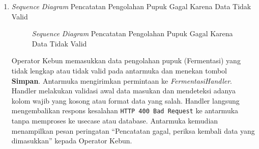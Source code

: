 \documentclass[a4paper,11pt]{article}
\begin{document}
\begin{enumerate}
    \textbf{Penjelasan Alur:}
    \begin{itemize}
        \item \textbf{Aksi Awal:} Operator Kebun membuka menu cek fermentasi pada batch yang terindikasi gagal.
        \item \textbf{Alur Backend:} Operator mengisi kondisi fisik, memilih status ``Gagal'', dan menekan \textbf{Simpan}. Antarmuka mengirim request status update dengan param \texttt{status=Gagal}.
        \item \textbf{Akses Data:} Usecase memanggil repositori fermentasi untuk mengubah status batch fermentasi terkait menjadi ``Gagal'' di database.
        \item \textbf{Output:} Data batch berhasil diperbarui di database dan antarmuka menampilkan notifikasi status gagal.
    \end{itemize}

    \item \textit{Sequence Diagram} Pencatatan Pengolahan Pupuk Gagal Karena Data Tidak Valid
    \begin{figure}[H]
        \centering
        \caption{\textit{Sequence Diagram} Pencatatan Pengolahan Pupuk Gagal Karena Data Tidak Valid}
        \label{fig:sd-fermentasi-invalid}
    \end{figure}

    \hspace{1em} Operator Kebun memasukkan data pengolahan pupuk (Fermentasi) yang tidak lengkap atau tidak valid pada antarmuka dan menekan tombol \textbf{Simpan}. Antarmuka mengirimkan permintaan ke \textit{FermentasiHandler}. Handler melakukan validasi awal data masukan dan mendeteksi adanya kolom wajib yang kosong atau format data yang salah. Handler langsung mengembalikan respons kesalahan \texttt{HTTP 400 Bad Request} ke antarmuka tanpa memproses ke usecase atau database. Antarmuka kemudian menampilkan pesan peringatan ``Pencatatan gagal, periksa kembali data yang dimasukkan'' kepada Operator Kebun.


\end{enumerate}
\end{document}
